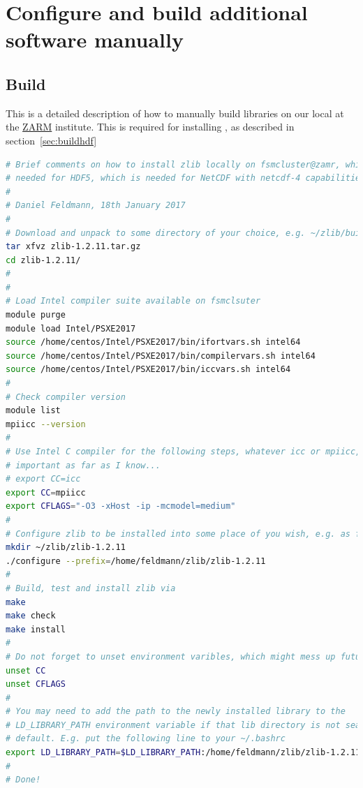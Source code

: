 \documentclass[a4paper, 11pt, DIV=11]{scrartcl}
\begin{document}
 
\section{Configure and build additional software manually}
\label{app:selfBuildLibraries}

\subsection{Build }
\label{sec:buildzlib}

This is a detailed description of how to manually build 
libraries on our local  at the
\href{https://www.zarm.uni-bremen.de/en/}{ZARM} institute. This is required
for installing \hdf, as described in section~\ref{sec:buildhdf}

\begin{lstlisting}[language=bash]
# Brief comments on how to install zlib locally on fsmcluster@zamr, which is
# needed for HDF5, which is needed for NetCDF with netcdf-4 capabilities.
#
# Daniel Feldmann, 18th January 2017
# 
# Download and unpack to some directory of your choice, e.g. ~/zlib/build
tar xfvz zlib-1.2.11.tar.gz
cd zlib-1.2.11/
#
#
# Load Intel compiler suite available on fsmclsuter
module purge
module load Intel/PSXE2017
source /home/centos/Intel/PSXE2017/bin/ifortvars.sh intel64
source /home/centos/Intel/PSXE2017/bin/compilervars.sh intel64
source /home/centos/Intel/PSXE2017/bin/iccvars.sh intel64
#
# Check compiler version
module list
mpiicc --version
#
# Use Intel C compiler for the following steps, whatever icc or mpiicc, is not
# important as far as I know...
# export CC=icc
export CC=mpiicc
export CFLAGS="-O3 -xHost -ip -mcmodel=medium"
#
# Configure zlib to be installed into some place of you wish, e.g. as follows 
mkdir ~/zlib/zlib-1.2.11
./configure --prefix=/home/feldmann/zlib/zlib-1.2.11 
#
# Build, test and install zlib via
make
make check
make install
#
# Do not forget to unset environment varibles, which might mess up future builds
unset CC
unset CFLAGS
#
# You may need to add the path to the newly installed library to the
# LD_LIBRARY_PATH environment variable if that lib directory is not searched by
# default. E.g. put the following line to your ~/.bashrc
export LD_LIBRARY_PATH=$LD_LIBRARY_PATH:/home/feldmann/zlib/zlib-1.2.11/lib
# 
# Done!
\end{lstlisting}
\end{document}
